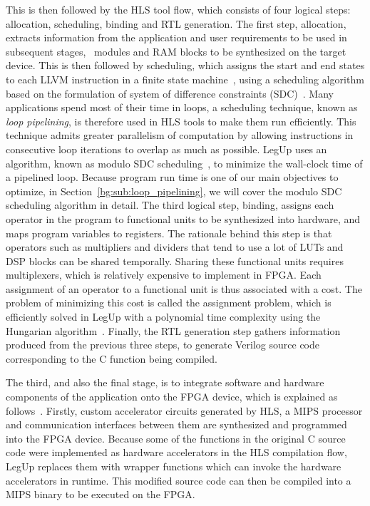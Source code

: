This is then followed by the HLS tool flow, which consists of four logical
steps: allocation, scheduling, binding and RTL generation.  The first
step, allocation, extracts information from the application and user
requirements to be used in subsequent stages, \eg~modules and RAM blocks to
be synthesized on the target device.  This is then followed by scheduling,
which assigns the start and end states to each LLVM instruction in a finite
state machine~\cite{legup}, using a scheduling algorithm based on the
formulation of system of difference constraints (SDC)~\cite{legup, canis13,
cong06}.  Many applications spend most of their time in loops, a scheduling
technique, known as \emph{loop pipelining}, is therefore used in HLS tools
to make them run efficiently.  This technique admits greater parallelism
of computation by allowing instructions in consecutive loop iterations to
overlap as much as possible.  LegUp uses an algorithm, known as modulo SDC
scheduling~\cite{canis14}, to minimize the wall-clock time of a pipelined
loop.  Because program run time is one of our main objectives to optimize, in
Section~\ref{bg:sub:loop_pipelining}, we will cover the modulo SDC scheduling
algorithm in detail.  The third logical step, binding, assigns each operator
in the program to functional units to be synthesized into hardware, and maps
program variables to registers.  The rationale behind this step is that
operators such as multipliers and dividers that tend to use a lot of LUTs and
DSP blocks can be shared temporally.  Sharing these functional units requires
multiplexers, which is relatively expensive to implement in FPGA\@.  Each
assignment of an operator to a functional unit is thus associated with a cost.
The problem of minimizing this cost is called the assignment problem, which
is efficiently solved in LegUp with a polynomial time complexity using the
Hungarian algorithm~\cite{canis13, kuhn10}.  Finally, the RTL generation step
gathers information produced from the previous three steps, to generate Verilog
source code corresponding to the C function being compiled.

The third, and also the final stage, is to integrate software and hardware
components of the application onto the FPGA device, which is explained as
follows~\cite{canis13}.  Firstly, custom accelerator circuits generated by HLS,
a MIPS processor and communication interfaces between them are synthesized and
programmed into the FPGA device.  Because some of the functions in the original
C source code were implemented as hardware accelerators in the HLS compilation
flow, LegUp replaces them with wrapper functions which can invoke the hardware
accelerators in runtime.  This modified source code can then be compiled into a
MIPS binary to be executed on the FPGA.


